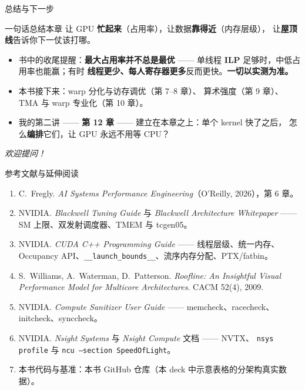 \documentclass[aspectratio=169]{beamer}
\newcommand{\kw}[1]{\textbf{\textcolor{kwblue}{#1}}}
\begin{document}
\begin{frame}{总结与下一步}
  \begin{block}{一句话总结本章}
    让 GPU \kw{忙起来}（占用率），让数据\kw{靠得近}（内存层级），
    让\kw{屋顶线}告诉你下一仗该打哪。
  \end{block}
  \begin{itemize}
    \item 书中的收尾提醒：\kw{最大占用率并不总是最优} ——
          单线程 \kw{ILP} 足够时，中低占用率也能赢；有时
          \kw{线程更少、每人寄存器更多}反而更快。\kw{一切以实测为准。}
    \item 本书接下来：warp 分化与访存调优（第 7--8 章）、
          算术强度（第 9 章）、TMA 与 warp 专业化（第 10 章）。
    \item 我的第二讲 —— \kw{第 12 章} —— 建立在本章之上：单个 kernel 快了之后，
          怎么\kw{编排}它们，让 GPU 永远不用等 CPU？
  \end{itemize}
  \medskip
  \centering\itshape 欢迎提问！
\end{frame}

\begin{frame}{参考文献与延伸阅读}
  {\footnotesize
  \begin{enumerate}
    \item C.\ Fregly. \emph{AI Systems Performance Engineering}（O'Reilly, 2026），第 6 章。
    \item NVIDIA. \emph{Blackwell Tuning Guide} 与 \emph{Blackwell Architecture Whitepaper} ——
          SM 上限、双发射调度器、TMEM 与 tcgen05。
    \item NVIDIA. \emph{CUDA C++ Programming Guide} —— 线程层级、统一内存、
          Occupancy API、\texttt{\_\_launch\_bounds\_\_}、流序内存分配、PTX/fatbin。
    \item S.\ Williams, A.\ Waterman, D.\ Patterson. \emph{Roofline: An Insightful Visual Performance
          Model for Multicore Architectures}. CACM 52(4), 2009.
    \item NVIDIA. \emph{Compute Sanitizer User Guide} —— memcheck、racecheck、initcheck、synccheck。
    \item NVIDIA. \emph{Nsight Systems} 与 \emph{Nsight Compute} 文档 —— NVTX、
          \texttt{nsys profile} 与 \texttt{ncu --section SpeedOfLight}。
    \item 本书代码与基准：本书 GitHub 仓库（本 deck 中示意表格的分架构真实数据）。
  \end{enumerate}}
\end{frame}
\end{document}
